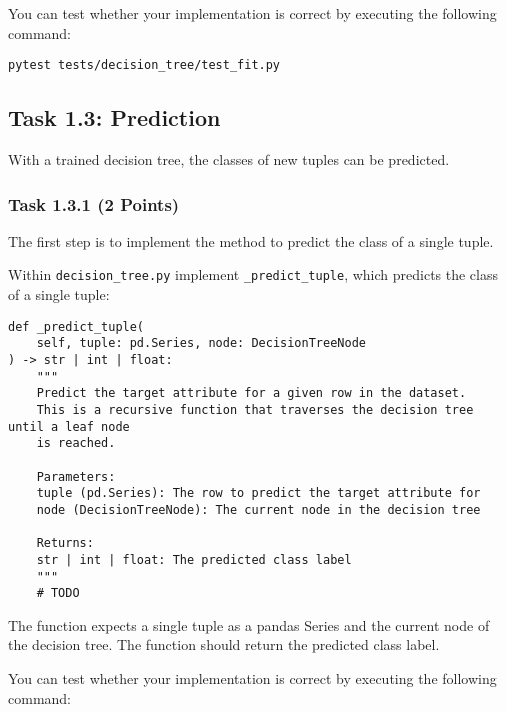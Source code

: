 \documentclass[
english,
smallborders
]{i6prcsht}
\newcommand{\points}[1]{\hfill \color{red}(#1 Points)\color{black}}
\begin{document}
You can test whether your implementation is correct by executing the following command:

\vspace*{0.3cm}

\begin{lstlisting}
pytest tests/decision_tree/test_fit.py
\end{lstlisting}

\vspace*{0.1cm}

\subsection*{Task 1.3: Prediction}

With a trained decision tree, the classes of new tuples can be predicted.

\subsubsection*{Task 1.3.1 \points{2}}

The first step is to implement the method to predict the class of a single tuple.

Within \texttt{decision\_tree.py} implement \texttt{\_predict\_tuple}, which predicts the class of a single tuple:

\vspace*{0.3cm}

\newpage

\begin{lstlisting}
def _predict_tuple(
	self, tuple: pd.Series, node: DecisionTreeNode
) -> str | int | float:
	"""
	Predict the target attribute for a given row in the dataset.
	This is a recursive function that traverses the decision tree until a leaf node
	is reached.

	Parameters:
	tuple (pd.Series): The row to predict the target attribute for
	node (DecisionTreeNode): The current node in the decision tree

	Returns:
	str | int | float: The predicted class label
	"""
	# TODO
\end{lstlisting}

\vspace*{0.1cm}

The function expects a single tuple as a pandas Series and the current node of the decision tree. The function should return the predicted class label.

You can test whether your implementation is correct by executing the following command:
\end{document}
